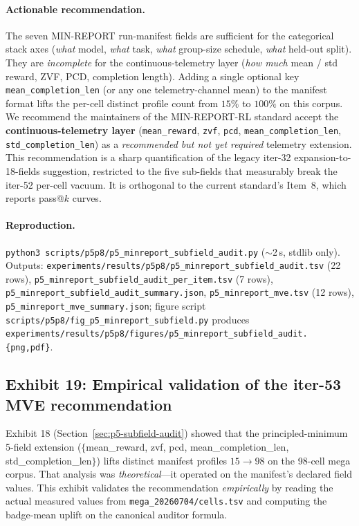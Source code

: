 \documentclass{article}  \usepackage[preprint,nonatbib]{neurips_2026} \usepackage[numbers]{natbib}
\providecommand{\secref}[1]{Section~\ref{#1}}
\begin{document}
\paragraph{Actionable recommendation.}
The seven MIN-REPORT run-manifest fields are sufficient for the categorical
stack axes (\textit{what} model, \textit{what} task, \textit{what}
group-size schedule, \textit{what} held-out split). They are
\emph{incomplete} for the continuous-telemetry layer (\textit{how
much} mean / std reward, ZVF, PCD, completion length). Adding a
single optional key \texttt{mean\_completion\_len} (or any one
telemetry-channel mean) to the manifest format lifts the per-cell
distinct profile count from $15\%$ to $100\%$ on this corpus. We
recommend the maintainers of the MIN-REPORT-RL standard accept the
\textbf{continuous-telemetry layer} (\texttt{mean\_reward},
\texttt{zvf}, \texttt{pcd}, \texttt{mean\_completion\_len},
\texttt{std\_completion\_len}) as a \emph{recommended but not yet
required} telemetry extension. This recommendation is a sharp quantification
of the legacy iter-32 expansion-to-18-fields suggestion, restricted to the
five sub-fields that measurably break the iter-52 per-cell vacuum. It is
orthogonal to the current standard's Item~8, which reports pass@$k$ curves.

\paragraph{Reproduction.}
\texttt{python3 scripts/p5p8/p5\_minreport\_subfield\_audit.py}
($\sim$2\,s, stdlib only). Outputs:
\texttt{experiments/results/p5p8/p5\_minreport\_subfield\_audit.tsv}
(22 rows), \texttt{p5\_minreport\_subfield\_audit\_per\_item.tsv}
(7 rows),
\texttt{p5\_minreport\_subfield\_audit\_summary.json},
\texttt{p5\_minreport\_mve.tsv} (12 rows),
\texttt{p5\_minreport\_mve\_summary.json};
figure script
\texttt{scripts/p5p8/fig\_p5\_minreport\_subfield.py} produces
\texttt{experiments/results/p5p8/figures/p5\_minreport\_subfield\_audit.\{png,pdf\}}.

\subsection{Exhibit 19: Empirical validation of the iter-53 MVE recommendation}
\label{sec:p5-mve-empirical}

Exhibit 18 (\secref{sec:p5-subfield-audit}) showed that the
principled-minimum 5-field extension
($\{$mean\_reward, zvf, pcd, mean\_completion\_len,
std\_completion\_len$\}$) lifts distinct manifest profiles
$15 \rightarrow 98$ on the 98-cell mega corpus. That analysis was
\emph{theoretical}---it operated on the manifest's declared field
values. This exhibit validates the recommendation \emph{empirically}
by reading the actual measured values from
\texttt{mega\_20260704/cells.tsv} and computing the badge-mean uplift
on the canonical auditor formula.
\end{document}
